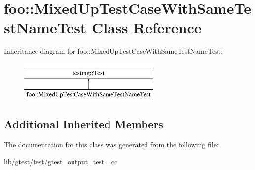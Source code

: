 \hypertarget{classfoo_1_1_mixed_up_test_case_with_same_test_name_test}{\section{foo\-:\-:Mixed\-Up\-Test\-Case\-With\-Same\-Test\-Name\-Test Class Reference}
\label{classfoo_1_1_mixed_up_test_case_with_same_test_name_test}
}
Inheritance diagram for foo\-:\-:Mixed\-Up\-Test\-Case\-With\-Same\-Test\-Name\-Test\-:\begin{figure}[H]
\begin{center}
\leavevmode
\includegraphics[height=2.000000cm]{classfoo_1_1_mixed_up_test_case_with_same_test_name_test}
\end{center}
\end{figure}
\subsection*{Additional Inherited Members}


The documentation for this class was generated from the following file\-:\begin{DoxyCompactItemize}
\item 
lib/gtest/test/\hyperlink{gtest__output__test___8cc}{gtest\-\_\-output\-\_\-test\-\_\-.\-cc}\end{DoxyCompactItemize}
